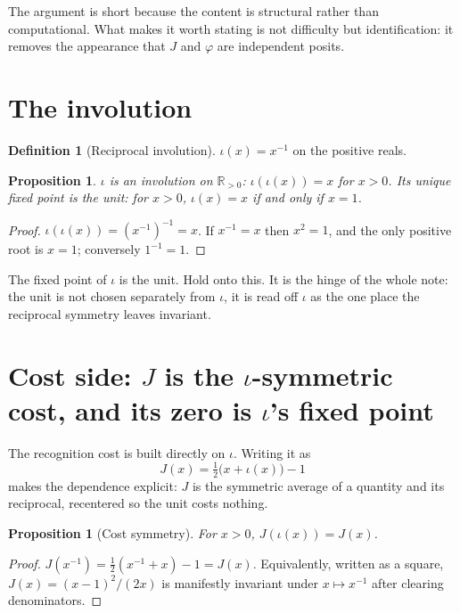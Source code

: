 \documentclass[11pt,a4paper]{article}
\newtheorem{proposition}[theorem]{Proposition}
\theoremstyle{definition}
\newtheorem{definition}[theorem]{Definition}
\theoremstyle{remark}
\newcommand{\Jcost}{J}
\begin{document}
The argument is short because the content is structural rather than
computational. What makes it worth stating is not difficulty but identification:
it removes the appearance that $J$ and $\varphi$ are independent posits.

\section{The involution}

\begin{definition}[Reciprocal involution]
$\iota(x)=x^{-1}$ on the positive reals.
\end{definition}

\begin{proposition}\label{prop:inv}
$\iota$ is an involution on $\mathbb{R}_{>0}$: $\iota(\iota(x))=x$ for $x>0$. Its
unique fixed point is the unit: for $x>0$, $\iota(x)=x$ if and only if $x=1$.
\end{proposition}

\begin{proof}
$\iota(\iota(x))=(x^{-1})^{-1}=x$. If $x^{-1}=x$ then $x^2=1$, and the only
positive root is $x=1$; conversely $1^{-1}=1$.
\end{proof}

The fixed point of $\iota$ is the unit. Hold onto this. It is the hinge of the
whole note: the unit is not chosen separately from $\iota$, it is read off $\iota$
as the one place the reciprocal symmetry leaves invariant.

\section{Cost side: $J$ is the $\iota$-symmetric cost, and its zero is $\iota$'s fixed point}

The recognition cost is built directly on $\iota$. Writing it as
\[
  \Jcost(x)=\tfrac12\bigl(x+\iota(x)\bigr)-1
\]
makes the dependence explicit: $J$ is the symmetric average of a quantity and its
reciprocal, recentered so the unit costs nothing.

\begin{proposition}[Cost symmetry]\label{prop:Jsym}
For $x>0$, $\Jcost(\iota(x))=\Jcost(x)$.
\end{proposition}

\begin{proof}
$\Jcost(x^{-1})=\tfrac12(x^{-1}+x)-1=\Jcost(x)$. Equivalently, written as a square,
$\Jcost(x)=(x-1)^2/(2x)$ is manifestly invariant under $x\mapsto x^{-1}$ after
clearing denominators.
\end{proof}
\end{document}
